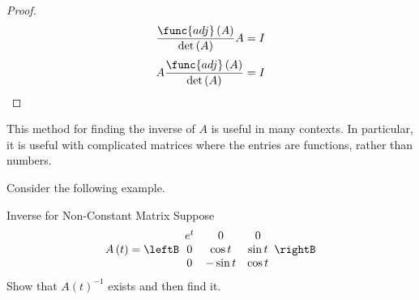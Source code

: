 \begin{proof}
\begin{equation}
\vspace{0.05in}\frac{\func{adj}\left( A\right)}{\det \left( A\right) } A=I
\end{equation}
%
\begin{equation}
\vspace{0.05in}A \frac{\func{adj}\left( A\right)}{\det \left( A\right) } =I
\end{equation}
%
%
\begin{equation*}
\end{equation*}
\end{proof}

This method for finding the inverse of $A$ is useful in many contexts. In particular, it 
is useful with complicated matrices where the entries are functions, rather than numbers.

Consider the following example. 

\begin{example}{Inverse for Non-Constant Matrix}\label{exa:inversenonconstantmatrix}
Suppose
\begin{equation*}
A\left( t\right) =\leftB
\begin{array}{ccc}
e^{t} & 0 & 0 \\
0 & \cos t & \sin t \\
0 & -\sin t & \cos t
\end{array}
\rightB
\end{equation*}
Show that $A\left( t\right) ^{-1}$ exists and then find it.
\end{example}

